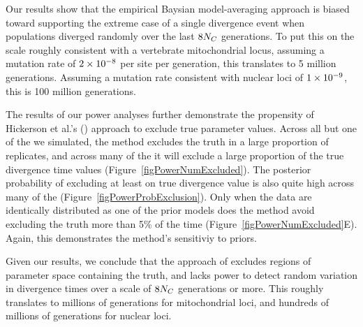 \documentclass[letterpaper,12pt]{article}
\begin{document}
\begin{linenumbers}
Our results show that the empirical Baysian model-averaging approach is biased
toward supporting the extreme case of a single divergence event when
populations diverged randomly over the last $8N_C$ generations.
To put this on the scale roughly consistent with a vertebrate mitochondrial
locus, assuming a mutation rate of $2\times 10^{-8}$ per site per generation, this
translates to 5 million generations.
Assuming a mutation rate consistent with nuclear loci of $1\times 10^{-9}$, this is 100
million generations.

The results of our power analyses further demonstrate the propensity of
Hickerson et al.'s (\citeyear{Hickerson2013}) approach to exclude true
parameter values.
Across all but one of the  we simulated, the method excludes the
truth in a large proportion of replicates, and across many of the  it
will exclude a large proportion of the true divergence time values
(Figure~\ref{figPowerNumExcluded}).
The posterior probability of excluding at least on true divergence value is
also quite high across many of the 
(Figure~\ref{figPowerProbExclusion}).
Only when the data are identically distributed as one of the prior models does
the method avoid excluding the truth more than 5\% of the time
(Figure~\ref{figPowerNumExcluded}E).
Again, this demonstrates the method's sensitiviy to priors.

Given our results, we conclude that the approach of \citet{Hickerson2013}
excludes regions of parameter space containing the truth, and lacks power to
detect random variation in divergence times over a scale of $8N_C$
generations or more.
This roughly translates to millions of generations for mitochondrial loci, and
hundreds of millions of generations for nuclear loci.



\end{linenumbers}
\end{document}
